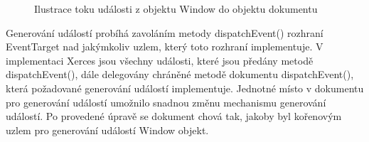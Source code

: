 \begin{figure}[H]
  \begin{center}
    \caption{Ilustrace toku události z objektu Window do objektu dokumentu}
    \label{Figure.EventWindowDocument}
  \end{center}
\end{figure}

Generování událostí probíhá zavoláním metody dispatchEvent() rozhraní EventTarget nad jakýmkoliv uzlem, který toto rozhraní implementuje. V implementaci Xerces jsou všechny události, které jsou předány metodě dispatchEvent(), dále delegovány chráněné metodě dokumentu dispatchEvent(), která požadované generování událostí implementuje. Jednotné místo v dokumentu pro generování událostí umožnilo snadnou změnu mechanismu generování událostí. Po provedené úpravě se dokument chová tak, jakoby byl kořenovým uzlem pro generování událostí Window objekt.

